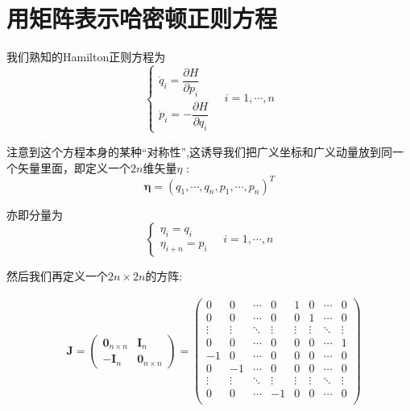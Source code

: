 \documentclass[12pt]{ctexart}
\begin{document}

\section{用矩阵表示哈密顿正则方程}

我们熟知的Hamilton正则方程为
\begin{equation}
    \begin{cases}\dot{q}_i=\dfrac{\partial H}{\partial p_i}\\\dot{p}_i=-\dfrac{\partial H}{\partial q_i}\end{cases}\quad i=1,\cdots,n
    \label{eq:1}
\end{equation}

注意到这个方程本身的某种“对称性”,这诱导我们把广义坐标和广义动量放到同一个矢量里面，即定义一个$2n$维矢量$\eta$ :
\begin{equation}
    \boldsymbol{\eta}=(q_1,\cdots,q_n,p_1,\cdots,p_n)^T
    \label{eq:2}
\end{equation}

亦即分量为
\begin{equation}
\left.\left\{\begin{array}{ll}\eta_i=q_i\\\eta_{i+n}=p_i\end{array}\right.\right.\quad i=1,\cdots,n
\label{eq:3}
\end{equation}


然后我们再定义一个$ 2n \times 2n $的方阵:

\begin{equation}
    \begin{aligned}
    &\boldsymbol{J} = \begin{pmatrix}
    \boldsymbol{0}_{n\times n} & \boldsymbol{I}_{n} \\
    -\boldsymbol{I}_{n} & \boldsymbol{0}_{n\times n}
    \end{pmatrix} = \begin{pmatrix}
    0 & 0 & \cdots & 0 & 1 & 0 & \cdots & 0 \\
    0 & 0 & \cdots & 0 & 0 & 1 & \cdots & 0 \\
    \vdots & \vdots & \ddots & \vdots & \vdots & \vdots & \ddots & \vdots \\
    0 & 0 & \cdots & 0 & 0 & 0 & \cdots & 1 \\
    -1 & 0 & \cdots & 0 & 0 & 0 & \cdots & 0 \\
    0 & -1 & \cdots & 0 & 0 & 0 & \cdots & 0 \\
    \vdots & \vdots & \ddots & \vdots & \vdots & \vdots & \ddots & \vdots \\
    0 & 0 & \cdots & -1 & 0 & 0 & \cdots & 0 \\
    \end{pmatrix} 
\end{aligned}
\label{eq:4}
\end{equation}
\end{document}

